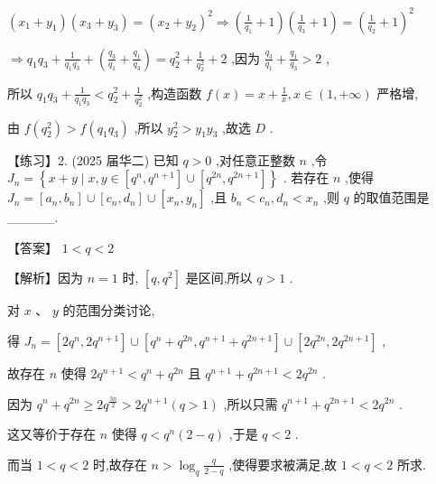 \documentclass[10pt]{article}
\begin{document}
\(\left( {{x}_{1} + {y}_{1}}\right) \left( {{x}_{3} + {y}_{3}}\right)  = {\left( {x}_{2} + {y}_{2}\right) }^{2} \Rightarrow  \left( {\frac{1}{{q}_{1}} + 1}\right) \left( {\frac{1}{{q}_{3}} + 1}\right)  = {\left( \frac{1}{{q}_{2}} + 1\right) }^{2}\)

\(\Rightarrow  {q}_{1}{q}_{3} + \frac{1}{{q}_{1}{q}_{3}} + \left( {\frac{{q}_{3}}{{q}_{1}} + \frac{{q}_{1}}{{q}_{3}}}\right)  = {q}_{2}^{2} + \frac{1}{{q}_{2}^{2}} + 2\) ,因为 \(\frac{{q}_{3}}{{q}_{1}} + \frac{{q}_{1}}{{q}_{3}} > 2\) ,

所以 \({q}_{1}{q}_{3} + \frac{1}{{q}_{1}{q}_{3}} < {q}_{2}^{2} + \frac{1}{{q}_{2}^{2}}\) ,构造函数 \(f\left( x\right)  = x + \frac{1}{x},x \in  \left( {1, + \infty }\right)\) 严格增,

由 \(f\left( {q}_{2}^{2}\right)  > f\left( {{q}_{1}{q}_{3}}\right)\) ,所以 \({y}_{2}^{2} > {y}_{1}{y}_{3}\) ,故选 \(D\) .

【练习】2. (2025 届华二) 已知 \(q > 0\) ,对任意正整数 \(n\) ,令 \({J}_{n} = \left\{  {x + y \mid  x,y \in  \left\lbrack  {{q}^{n},{q}^{n + 1}}\right\rbrack   \cup  \left\lbrack  {{q}^{2n},{q}^{{2n} + 1}}\right\rbrack  }\right\}\) . 若存在 \(n\) ,使得 \({J}_{n} = \left\lbrack  {{a}_{n},{b}_{n}}\right\rbrack   \cup  \left\lbrack  {{c}_{n},{d}_{n}}\right\rbrack   \cup  \left\lbrack  {{x}_{n},{y}_{n}}\right\rbrack\) ,且 \({b}_{n} < {c}_{n},{d}_{n} < {x}_{n}\) ,则 \(q\) 的取值范围是\_\_\_\_\_.

【答案】 \(1 < q < 2\)

【解析】因为 \(n = 1\) 时, \(\left\lbrack  {q,{q}^{2}}\right\rbrack\) 是区间,所以 \(q > 1\) .

对 \(x\text{ 、 }y\) 的范围分类讨论,

得 \({J}_{n} = \left\lbrack  {2{q}^{n},2{q}^{n + 1}}\right\rbrack   \cup  \left\lbrack  {{q}^{n} + {q}^{2n},{q}^{n + 1} + {q}^{{2n} + 1}}\right\rbrack   \cup  \left\lbrack  {2{q}^{2n},2{q}^{{2n} + 1}}\right\rbrack\) ,

故存在 \(n\) 使得 \(2{q}^{n + 1} < {q}^{n} + {q}^{2n}\) 且 \({q}^{n + 1} + {q}^{{2n} + 1} < 2{q}^{2n}\) .

因为 \({q}^{n} + {q}^{2n} \geq  2{q}^{\frac{3n}{2}} > 2{q}^{n + 1}\left( {q > 1}\right)\) ,所以只需 \({q}^{n + 1} + {q}^{{2n} + 1} < 2{q}^{2n}\) .

这又等价于存在 \(n\) 使得 \(q < {q}^{n}\left( {2 - q}\right)\) ,于是 \(q < 2\) .

而当 \(1 < q < 2\) 时,故存在 \(n > {\log }_{q}\frac{q}{2 - q}\) ,使得要求被满足,故 \(1 < q < 2\) 所求.
\end{document}
